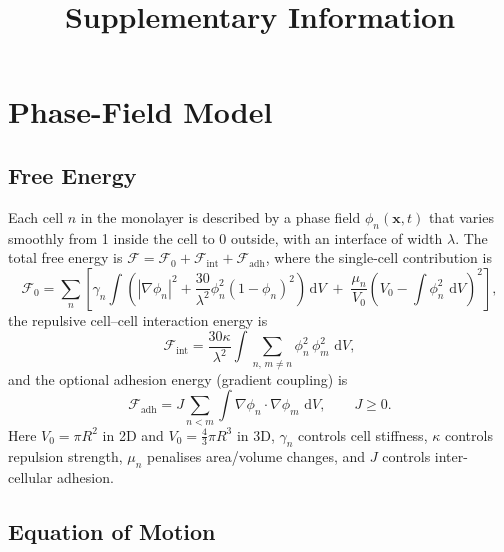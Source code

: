 \documentclass[11pt]{article}
\title{Supplementary Information}
\author{}
\date{}
\newcommand{\phin}{\phi_n}
\newcommand{\dV}{\,\mathrm{d}V}
\begin{document}
\maketitle
\tableofcontents
\newpage

\section{Phase-Field Model}
\label{sec:model}

\subsection{Free Energy}

Each cell $n$ in the monolayer is described by a phase field $\phin(\mathbf{x},t)$ that varies smoothly from 1 inside the cell to 0 outside, with an interface of width $\lambda$.  The total free energy is $\mathcal{F} = \mathcal{F}_0 + \mathcal{F}_{\mathrm{int}} + \mathcal{F}_{\mathrm{adh}}$, where the single-cell contribution is
\begin{equation}
\label{eq:F0}
\mathcal{F}_0 = \sum_n \left[\gamma_n \int \left(|\nabla\phin|^2 + \frac{30}{\lambda^2}\phin^2(1-\phin)^2\right)\dV \;+\; \frac{\mu_n}{V_0}\left(V_0 - \int \phin^2\,\dV\right)^{\!2}\right],
\end{equation}
the repulsive cell--cell interaction energy is
\begin{equation}
\label{eq:Fint}
\mathcal{F}_{\mathrm{int}} = \frac{30\kappa}{\lambda^2}\int \sum_{n,\,m\neq n} \phin^2\,\phi_m^2\,\dV,
\end{equation}
and the optional adhesion energy (gradient coupling) is
\begin{equation}
\label{eq:Fadh}
\mathcal{F}_{\mathrm{adh}} = J\sum_{n<m}\int \nabla\phin \cdot \nabla\phi_m\,\dV, \qquad J \ge 0.
\end{equation}
Here $V_0 = \pi R^2$ in 2D and $V_0 = \frac{4}{3}\pi R^3$ in 3D, $\gamma_n$ controls cell stiffness, $\kappa$ controls repulsion strength, $\mu_n$ penalises area/volume changes, and $J$ controls inter-cellular adhesion.

\subsection{Equation of Motion}
\end{document}
